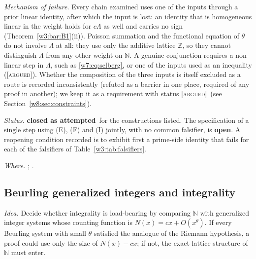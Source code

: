 \documentclass[11pt]{amsart}
\theoremstyle{definition}
\theoremstyle{remark}
\numberwithin{equation}{section}
\newcommand{\N}{\mathbb{N}}
\newcommand{\Z}{\mathbb{Z}}
\newcommand{\stag}[1]{\textsc{[#1]}}
\newcommand{\ARGUED}{\stag{argued}}
\newcommand{\rtag}[1]{\textbf{\small\textsf{#1}}}
\newcommand{\closedA}{\rtag{closed as attempted}}
\newcommand{\openR}{\rtag{open}}
\newcommand{\entry}[1]{\par\smallskip\noindent\textit{#1.}\enspace}
\begin{document}
\entry{Mechanism of failure} Every chain examined uses one of the inputs through a prior linear identity,
after which the input is lost: an identity that is homogeneous linear in the weight holds for $c\Lambda$ as well
and carries no sign (Theorem~\ref{w3:bar:B1}(ii)). Poisson summation and the functional equation of $\theta$
do not involve $\Lambda$ at all: they use only the additive lattice $\Z$, so they cannot distinguish $\Lambda$
from any other weight on $\N$. A genuine conjunction requires a non-linear step in $\Lambda$,
such as \eqref{w7:eq:selberg}, or one of the inputs used as an inequality (\ARGUED). Whether the composition of
the three inputs is itself excluded as a route is recorded inconsistently (refuted as a barrier in one place,
required of any proof in another); we keep it as a requirement with status \ARGUED\ (see
Section~\ref{w8:sec:constraints}).

\entry{Status} \closedA\ for the constructions listed. The specification of a single step using (E), (F) and
(I) jointly, with no common falsifier, is \openR. A reopening condition recorded is to exhibit first a
prime-side identity that fails for each of the falsifiers of Table~\ref{w3:tab:falsifiers}.

\entry{Where} \cite{P10,P28,P19}; \cite{Hamburger1921,Selberg1992,KaczorowskiPerelli1999,DavenportHeilbronn1936}.

\subsection{Beurling generalized integers and integrality}\label{w7:fam:R20}

\entry{Idea} Decide whether integrality is load-bearing by comparing $\N$ with generalized integer systems
whose counting function is $N(x)=cx+O(x^\theta)$. If every Beurling system with small $\theta$ satisfied the
analogue of the Riemann hypothesis, a proof could use only the size of $N(x)-cx$; if not, the exact lattice
structure of $\N$ must enter.
\end{document}
